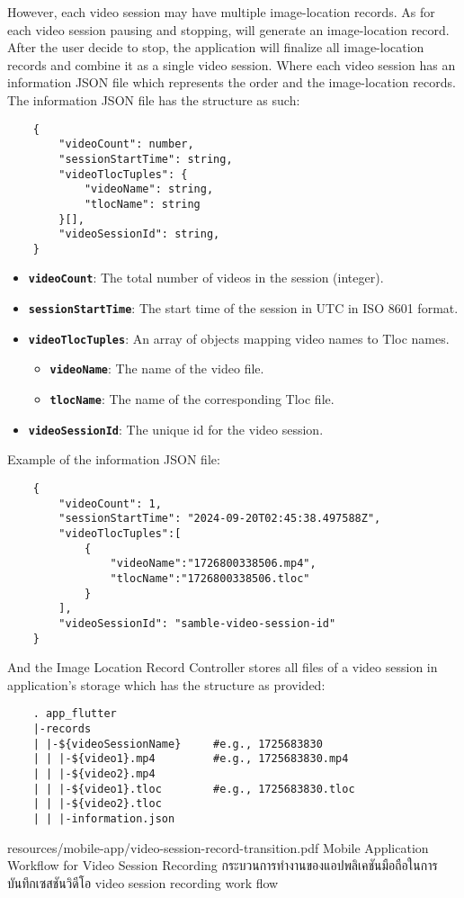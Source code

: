 \begin{enumerate}
However, each video session may have multiple image-location records. As for each video session pausing and stopping, will generate an image-location record. After the user decide to stop, the application will finalize all image-location records and combine it as a single video session. Where each video session has an information JSON file which represents the order and the image-location records. The information JSON file has the structure as such:
\begin{lstlisting}
    {
        "videoCount": number,
        "sessionStartTime": string,
        "videoTlocTuples": {
            "videoName": string, 
            "tlocName": string 
        }[],
        "videoSessionId": string,
    }
\end{lstlisting}
\begin{itemize}
    \item \textbf{\texttt{videoCount}}: The total number of videos in the session (integer).
    \item \textbf{\texttt{sessionStartTime}}: The start time of the session in UTC in ISO 8601 format.
    \item \textbf{\texttt{videoTlocTuples}}: An array of objects mapping video names to Tloc names.
    \begin{itemize}
        \item \textbf{\texttt{videoName}}: The name of the video file.
        \item \textbf{\texttt{tlocName}}: The name of the corresponding Tloc file.
    \end{itemize}
    \item \textbf{\texttt{videoSessionId}}: The unique id for the video session.
\end{itemize}
Example of the information JSON file:
\begin{lstlisting}
    {
        "videoCount": 1,
        "sessionStartTime": "2024-09-20T02:45:38.497588Z",
        "videoTlocTuples":[
            {
                "videoName":"1726800338506.mp4",
                "tlocName":"1726800338506.tloc"
            }
        ],
        "videoSessionId": "samble-video-session-id"
    }
\end{lstlisting}
And the Image Location Record Controller stores all files of a video session in application's storage which has the structure as provided:
\begin{lstlisting}
    . app_flutter
    |-records
    | |-${videoSessionName}     #e.g., 1725683830
    | | |-${video1}.mp4         #e.g., 1725683830.mp4
    | | |-${video2}.mp4
    | | |-${video1}.tloc        #e.g., 1725683830.tloc
    | | |-${video2}.tloc
    | | |-information.json
\end{lstlisting}
\end{enumerate}
\insertPDFfigure
{resources/mobile-app/video-session-record-transition.pdf}
{\ifenglish Mobile Application Workflow for Video Session Recording \else กระบวนการทำงานของแอปพลิเคชันมือถือในการบันทึกเซสชันวิดีโอ \fi}
{video session recording work flow}